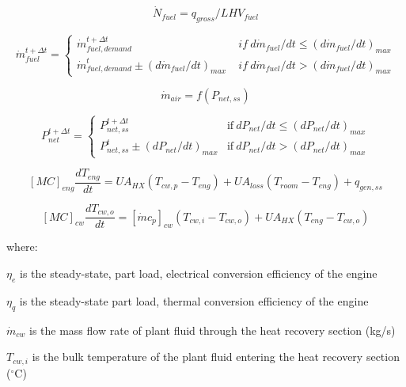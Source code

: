 \begin{equation}
{\dot N_{fuel}} = {q_{gross}}/LH{V_{fuel}}
\end{equation}

\begin{equation}
\dot m_{fuel}^{t+\Delta t} = \left\{
    \begin{array}{cl}
      \dot m_{fuel,demand}^{t+\Delta t}       &\; if~d\dot m_{fuel} / dt \le (d\dot m_{fuel}/dt)_{max} \\
      \dot m_{fuel,demand}^t \pm (d\dot m_{fuel}/dt)_{max}      &\; if~d\dot m_{fuel} / dt > (d\dot m_{fuel}/dt)_{max}
    \end{array}
  \right.
\end{equation}

\begin{equation}
{\dot m_{air}} = f({P_{net,ss}})
\end{equation}

\begin{equation}
P_{net}^{t+\Delta t} = \left\{
    \begin{array}{cl}
      P_{net,ss}^{t+\Delta t}                   & \text{if}~dP_{net} / dt \le (dP_{net}/dt)_{max} \\
      P_{net,ss}^t \pm (dP_{net}/dt)_{max}      & \text{if}~dP_{net} / dt > (dP_{net}/dt)_{max}
    \end{array}
  \right.
\end{equation}

\begin{equation}
{[MC]_{eng}}\frac{{d{T_{eng}}}}{{dt}} = U{A_{HX}}\left( {{T_{cw,p}} - {T_{eng}}} \right) + U{A_{loss}}\left( {{T_{room}} - {T_{eng}}} \right) + {q_{gen,ss}}
\end{equation}

\begin{equation}
{[MC]_{cw}}\frac{{d{T_{cw,o}}}}{{dt}} = {[\dot m{c_p}]_{cw}}\left( {{T_{cw,i}} - {T_{cw,o}}} \right) + U{A_{HX}}\left( {{T_{eng}} - {T_{cw,o}}} \right)
\end{equation}

where:

\({\eta_e}\) is the steady-state, part load, electrical conversion efficiency of the engine

\({\eta_q}\) is the steady-state part load, thermal conversion efficiency of the engine

\({\dot m_{cw}}\) is the mass flow rate of plant fluid through the heat recovery section (kg/s)

\({T_{cw,i}}\) is the bulk temperature of the plant fluid entering the heat recovery section (\(^{\circ}\)C)

